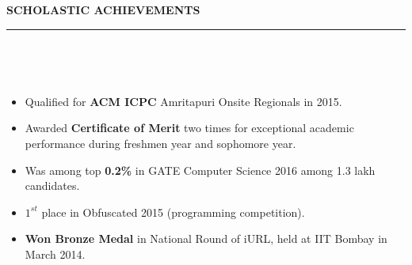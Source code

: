 \documentclass[a4paper,10pt]{article}
\newcommand{\isep}{-2 pt}
\newcommand{\lsep}{-0.5cm}
\newcommand{\resheading}[1]{{\small
        {
            \begin{minipage}
                {0.975\textwidth}\textbf{{\textsc{#1 \vphantom{p\^{E}} }}}
                \\[-0.3cm]
                \hrule
            \end{minipage}
            \\[-0.5cm]
        }
 }}
\begin{document}
\resheading{\textbf{\large SCHOLASTIC ACHIEVEMENTS}}\\[\lsep]
\begin{itemize}\itemsep \isep
    \item Qualified for \textbf{ACM ICPC} Amritapuri Onsite Regionals in 2015.
    \item Awarded \textbf{Certificate of Merit} two times for exceptional academic performance during freshmen year and sophomore year.
    \item Was among top \textbf{0.2\%} in GATE Computer Science 2016 among 1.3 lakh candidates.
    \item \textbf{$1^{st}$} place in Obfuscated 2015 (programming competition).
    \item \textbf{Won Bronze Medal} in National Round of iURL, held at IIT Bombay in March 2014.
\end{itemize}
\end{document}

